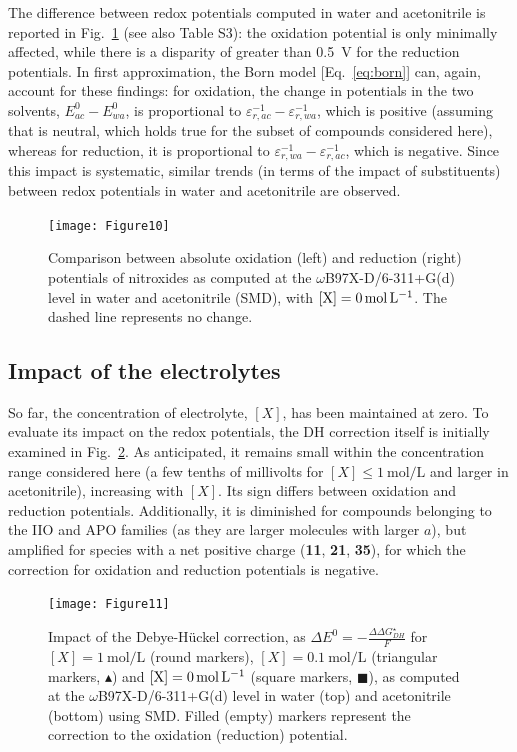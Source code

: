 \documentclass[review,preprint]{elsarticle}
\begin{document}
The difference between redox potentials computed in water and acetonitrile is reported in Fig.~\ref{fig:watvsac} (see also Table S3):  the oxidation potential is only minimally affected, while there is a disparity of greater than \SI{0.5}{\volt} for the reduction potentials. In first approximation, the Born model [Eq.~\eqref{eq:born}] can, again, account for these findings: for oxidation, the change in potentials in the two solvents, $E^0_{ac} - E^0_{wa}$, is proportional to $\varepsilon_{r,ac}^{-1}-\varepsilon_{r,wa}^{-1}$, which is positive (assuming that  is neutral, which holds true for the subset of compounds considered here), whereas for reduction, it is proportional to $\varepsilon_{r,wa}^{-1}-\varepsilon_{r,ac}^{-1}$, which is negative. Since this impact is systematic, similar trends (in terms of the impact of substituents) between redox potentials in water and acetonitrile are observed.


\begin{figure}[!h]
	\centering
	\texttt{[image: Figure10]}
	\caption{Comparison between absolute oxidation (left) and reduction (right) potentials of nitroxides as computed at the $\omega$B97X-D/6-311+G(d) level in water and acetonitrile (SMD), with $[\ce{X}]=\SI{0}{\mole\per\liter}$. The dashed line represents no change. }
	\label{fig:watvsac}
\end{figure}

\clearpage
\subsection{Impact of the electrolytes} \label{sec:elect}

So far, the concentration of electrolyte, $[X]$, has been maintained at zero. To evaluate its impact on the redox potentials, the DH correction itself is initially examined in Fig.~\ref{fig:DH}. As anticipated, it remains small within the concentration range considered here (a few tenths of millivolts for $[X] \leq \SI{1}{\mole\per\liter}$ and larger in acetonitrile), increasing with $[X]$. Its sign differs between oxidation and reduction potentials. Additionally, it is diminished for compounds belonging to the IIO and APO families (as they are larger molecules with larger $a$), but amplified for species with a net positive charge (\textbf{11}, \textbf{21}, \textbf{35}), for which the correction for oxidation and reduction potentials is negative.


\begin{figure}[!b]
	\centering
	\texttt{[image: Figure11]}
	\caption{Impact of the Debye-Hückel correction, as $\Delta E^0 = -\frac{\Delta \Delta G_{DH}^\star}{F}$ for $[X]=\SI{1}{\mole\per\liter}$ (round markers), $[X]=\SI{0.1}{\mole\per\liter}$ (triangular markers, $\blacktriangle$)  and $[\ce{X}]=\SI{0}{\mole\per\liter}$ (square markers, $\blacksquare$), as computed at the $\omega$B97X-D/6-311+G(d) level in water (top) and acetonitrile (bottom) using SMD. Filled (empty) markers represent the correction to the oxidation (reduction) potential. }
	\label{fig:DH}
\end{figure}
\end{document}
